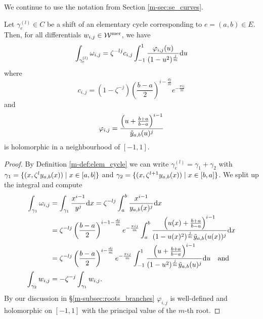 \documentclass[main.tex]{subfiles}
\begin{document}
  We continue to use the notation from Section \ref{m-sec:se_curves}.

  \begin{thm}\label{thm:periods}
   Let $\gamma_e^{(l)} \in C$ be a shift of an elementary cycle corresponding
   to $e = (a,b) \in E$. Then, for all differentials $w_{i,j} \in \mathcal{W}^{\text{mer}}$, we have
   \begin{equation}
      \label{eq:thm_periods_1} 
      \int_{\gamma_e^{(l)}} \omega_{i,j}  =  \zeta^{-lj} c_{i,j} \int_{-1}^1 \frac{\varphi_{i,j}(u)}{(1-u^2)^{\frac{j}{m}}}  \mathrm d u
   \end{equation}
   where
   \begin{equation}
    c_{i,j}   =  (1-\zeta^{-j}) \left(\frac{b-a}{2}\right)^{i-\frac{dj}{m}} e^{-\frac{\pi i j}{m}}
   \end{equation}
   and 
   \begin{equation}
    \varphi_{i,j}  = \frac{\left(u+\frac{b+a}{b-a}\right)^{i-1}}{\tilde{y}_{a,b}(u)^j}
   \end{equation}
   is holomorphic in a neighbourhood of $[-1,1]$.
  \end{thm}
  \begin{proof}
    By Definition \ref{m-def:elem_cycle} we can write $\gamma_e^{(l)} = \gamma_1 + \gamma_2$ with $\gamma_1 = \{  (x,\zeta^l y_{a,b}(x))  \mid  x \in [a,b]  \}$ and
    $\gamma_2 = \{  (x,\zeta^{l+1}y_{a,b}(x))  \mid  x \in [b,a]  \}$. We split up the integral and compute
    \begin{align}\label{eq:thm_periods_2}
    \begin{split}
     \int_{\gamma_1} \omega_{i,j}  & =  \int_{\gamma_1} \frac{x^{i-1}}{y^j}  \mathrm d x  =  \zeta^{-lj} \int_a^b \frac{x^{i-1}}{y_{a,b}(x)^j}  \mathrm d x \\  & = 
     \zeta^{-lj} \left(\frac{b-a}{2}\right)^{i-1-\frac{dj}{m}} e^{-\frac{\pi i j}{m}}
     \int_a^b \frac{\left(u(x)+\frac{b+a}{b-a}\right)^{i-1}}{(1-u(x)^2)^{\frac{j}{m}}\tilde{y}_{a,b}(u(x))^j}  \mathrm d x \\
      & =    \zeta^{-lj} \left(\frac{b-a}{2}\right)^{i-\frac{dj}{m}} e^{-\frac{\pi i j}{m}}
     \int_{-1}^1 \frac{\left(u+\frac{b+a}{b-a}\right)^{i-1}}{(1-u^2)^{\frac{j}{m}}\tilde{y}_{a,b}(u)^j}  \mathrm d u \quad \text{and} \\
    \int_{\gamma_2} w_{i,j}  & =  - \zeta^{-j} \int_{\gamma_1} w_{i,j}.
    \end{split}
  \end{align}
  By our discussion in \S \ref{m-subsec:roots_branches} $\varphi_{i,j}$ is
  well-defined and holomorphic on $[-1,1]$ with the principal value of the
      $m$-th root.
  \end{proof}
\end{document}
